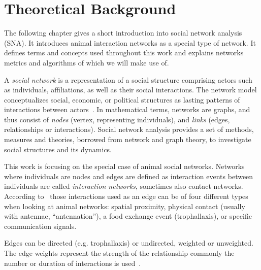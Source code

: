 \chapter{Theoretical Background}
\label{ch:bg}
The following chapter gives a short introduction into social network analysis (SNA). It introduces animal interaction networks as a special type of network. It defines terms and concepts used throughout this work and explains networks metrics and algorithms of which we will make use of.

A \emph{social network} is a representation of a social structure comprising actors such as individuals, affiliations, as well as their social interactions.
The network model conceptualizes social, economic, or political structures as lasting patterns of interactions between actors~\cite{wasserman1994social}.
In mathematical terms, networks are graphs, and thus consist of \emph{nodes} (vertex, representing individuals), and \emph{links} (edges, relationships or interactions).
Social network analysis provides a set of methods, measures and theories, borrowed from network and graph theory, to investigate social structures and its dynamics.

This work is focusing on the special case of animal social networks.
Networks where individuals are nodes and edges are defined as interaction events between individuals are called \emph{interaction networks}, sometimes also contact networks. 
According to~\textcite{charbonneau2013social} those interactions used as an edge can be of four different types when looking at animal networks: spatial proximity, physical contact (usually with antennae, “antennation”), a food exchange event (trophallaxis), or specific communication signals.

Edges can be directed (e.g. trophallaxis) or undirected, weighted or unweighted. The edge weights represent the strength of the relationship commonly the number or duration of interactions is used~\cite{farine2015constructing}.

